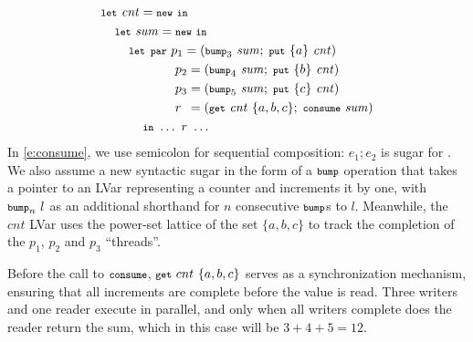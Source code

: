 \begin{equation}\label{e:consume}
\begin{split}
& \letexp{\mathit{cnt}}{\NEW}{ \\
& \letspace \letexp{\mathit{sum}}{\NEW}{ \\
& \letspace \letspace \LETPAR      ~p_1 = (\BUMP_3~{\mathit{sum}};\; \PUT ~ \{a\} ~ \mathit{cnt})\\
& \letspace \letspace \letparspace ~p_2 = (\BUMP_4~{\mathit{sum}};\; \PUT ~ \{b\} ~ \mathit{cnt})\\
& \letspace \letspace \letparspace ~p_3 = (\BUMP_5~{\mathit{sum}};\; \PUT ~ \{c\} ~ \mathit{cnt})\\
& \letspace \letspace \letparspace ~r  \hspace{0.47em} = (\getexp{\mathit{cnt}}\{a,b,c\};\; \consumeexp{\mathit{sum}})\\
& \letspace \letspace \letspace \IN~ \dots~r~\dots
}}
\end{split}
\end{equation}
In \eqref{e:consume},
we use semicolon for sequential composition: $e_1; e_2$ is sugar for .
We also assume a new syntactic sugar in
the form of a $\mbox{\footnotesize \texttt{bump}}$ operation that takes a pointer to an LVar representing a counter and increments it by one,
with $\mbox{\footnotesize \texttt{bump}}_n~l$ as an additional shorthand for $n$ consecutive
$\mbox{\footnotesize \texttt{bump}}$s to $l$.
Meanwhile, the $\mathit{cnt}$ LVar uses the power-set lattice of the set $\{a,b,c\}$ to track the completion
of the $p_1$, $p_2$ and $p_3$ ``threads''.


Before the call to $\mbox{\footnotesize \texttt{consume}}$, $\mbox{\footnotesize \texttt{get}}~cnt~\{a,b,c\}$ serves
as a synchronization mechanism, ensuring that all increments are
complete before the value is read.
Three writers and one reader execute in parallel, and only
when all writers complete does the reader return the sum,
which in this case will be $3 + 4 + 5 = 12$.
%


